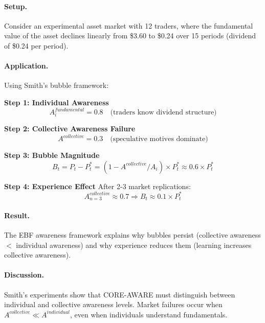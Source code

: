 \paragraph{Setup.} Consider an experimental asset market with 12 traders, where
the fundamental value of the asset declines linearly from \$3.60 to \$0.24 over
15 periods (dividend of \$0.24 per period).

\paragraph{Application.} Using Smith's bubble framework:

\textbf{Step 1: Individual Awareness}
\begin{equation}
A_i^{fundamental} = 0.8 \quad \text{(traders know dividend structure)}
\end{equation}

\textbf{Step 2: Collective Awareness Failure}
\begin{equation}
A^{collective} = 0.3 \quad \text{(speculative motives dominate)}
\end{equation}

\textbf{Step 3: Bubble Magnitude}
\begin{equation}
B_t = P_t - P^*_t = (1 - A^{collective}/A_i) \times P^*_t \approx 0.6 \times P^*_t
\end{equation}

\textbf{Step 4: Experience Effect}
After 2-3 market replications:
\begin{equation}
A^{collective}_{n=3} \approx 0.7 \Rightarrow B_t \approx 0.1 \times P^*_t
\end{equation}

\paragraph{Result.} The EBF awareness framework explains why bubbles persist
(collective awareness $<$ individual awareness) and why experience reduces them
(learning increases collective awareness).

\paragraph{Discussion.} Smith's experiments show that CORE-AWARE must distinguish
between individual and collective awareness levels. Market failures occur when
$A^{collective} \ll A^{individual}$, even when individuals understand fundamentals.


